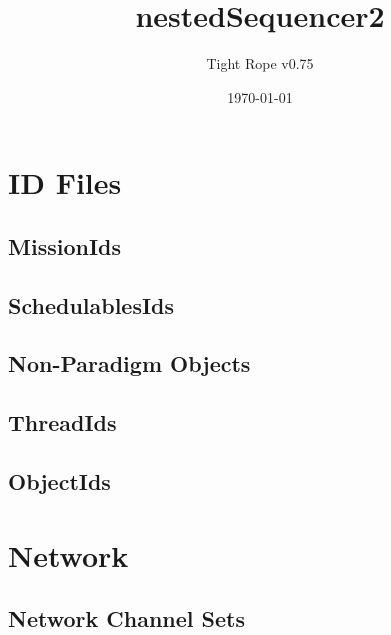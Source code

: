 \documentclass[10pt,a4paper]{article}
\title{nestedSequencer2}
\author{Tight Rope v0.75}
\date{\today}
\begin{document}
\maketitle

\section{ID Files}
\subsection{MissionIds}

\newpage

\subsection{SchedulablesIds}

\newpage

\subsection{Non-Paradigm Objects}
\newpage

\subsection{ThreadIds}

\newpage

\subsection{ObjectIds}

\newpage

\section{Network}
\subsection{Network Channel Sets}




{}
\end{document}
